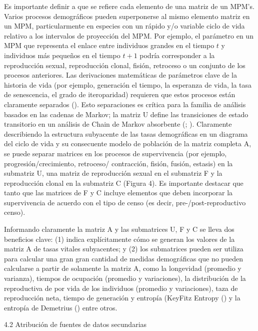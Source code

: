 \documentclass[
]{book}
\theoremstyle{definition}
\theoremstyle{definition}
\theoremstyle{definition}
\theoremstyle{definition}
\theoremstyle{remark}
\begin{document}
Es importante definir a que se refiere cada elemento de una matriz de un MPM's. Varios procesos demográficos pueden superponerse al mismo elemento matriz en un MPM, particularmente en especies con un rápido y/o variable ciclo de vida relativo a los intervalos de proyección del MPM. Por ejemplo, el parámetro en un MPM que representa el enlace entre individuos grandes en el tiempo \(t\) y individuos más pequeños en el tiempo \(t+1\) podría corresponder a la reproducción sexual, reproducción clonal, fisión, retroceso o un conjunto de los procesos anteriores. Las derivaciones matemáticas de parámetros clave de la historia de vida (por ejemplo, generación el tiempo, la esperanza de vida, la tasa de senescencia, el grado de iteroparidad) requieren que estos procesos están claramente separados (\citet{jones2022rcompadre}). Esto separaciones es crítica para la familia de análisis basados en las cadenas de Markov; la matriz U define las transiciones de estado transitorio en un análisis de Chain de Markov absorbente (\citet{caswell2011beyond}; \citet{caswell2013age}). Claramente describiendo la estructura subyacente de las tasas demográficas en un diagrama del ciclo de vida y su consecuente modelo de población de la matriz completa A, se puede separar matrices en los procesos de supervivencia (por ejemplo, progresión/crecimiento, retroceso/ contracción, fisión, fusión, estasis) en la submatriz U, una matriz de reproducción sexual en el submatriz F y la reproducción clonal en la submatriz C (Figura 4). Es importante destacar que tanto que las matrices de F y C incluye elementos que deben incorporar la supervivencia de acuerdo con el tipo de censo (es decir, pre-/post-reproductivo censo).

Informando claramente la matriz A y las submatrices U, F y C se lleva dos beneficios clave: (1) indica explícitamente cómo se generan los valores de la matriz A de tasas vitales subyacentes; y (2) los submatrices pueden ser utiliza para calcular una gran gran cantidad de medidas demográficas que no pueden calcularse a partir de solamente la matriz A, como la longevidad (promedio y varianza), tiempos de ocupación (promedio y variaciones), la distribución de la reproductiva de por vida de los individuos (promedio y variaciones), taza de reproducción neta, tiempo de generación y entropía (KeyFitz Entropy (\citet{keyfitz1968changing}) y la entropía de Demetrius (\citet{demetrius1992growth}) entre otros.

4.2 \textbar{} Atribución de fuentes de datos secundarias
\end{document}
